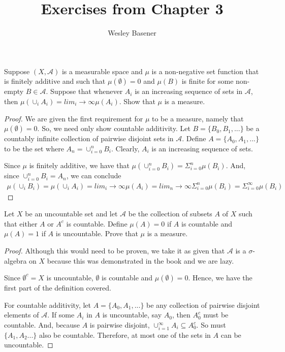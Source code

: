 \documentclass[10pt]{article}
\newenvironment{problem}[2][Problem]{\begin{trivlist}
		\item[\hskip \labelsep {\bfseries #1}\hskip \labelsep {\bfseries #2.}]}{\end{trivlist}}
\begin{document}
	
	\title{Exercises from Chapter 3}
	\author{Wesley Basener}
	\maketitle
	
	\begin{problem}{1}
		Suppose $(X, \mathcal{A})$ is a measurable space and $\mu$ is a
		non-negative set function that is finitely additive and such that
		$\mu(\emptyset) = 0$ and $\mu(B)$ is finite for some non-empty $B \in \mathcal{A}$. Suppose that whenever $A_i$ is an increasing sequence of sets in $\mathcal{A}$, then
		$\mu(\cup_i A_i ) = lim_i \rightarrow \infty \mu(A_i)$. Show that $\mu$ is a measure.
		\begin{proof}
			We are given the first requirement for $\mu$ to be a measure, namely that $\mu(\emptyset) = 0$. So, we need only show countable additivity. Let $B = \{B_0, B_1, ...\}$ be a countably infinite collection of pairwise disjoint sets in $\mathcal{A}$. Define $A = \{A_0, A_1, ...\}$ to be the set where $A_n = \cup_{i=0}^n B_i$. Clearly, $A_i$ is an increasing sequence of sets.
			
			Since $\mu$ is finitely additive, we have that $\mu( \cup_{i=0}^n B_i) = \Sigma_{i=0}^n \mu(B_i)$. And, since $\cup_{i=0}^n B_i = A_n$, we can conclude
			\begin{align*}
				\mu(\cup_i B_i) = \mu(\cup_i A_i) = lim_i \rightarrow \infty \mu(A_i) = lim_n \rightarrow \infty \Sigma_{i=0}^n \mu(B_i) = \Sigma_{i=0}^\infty \mu(B_i)
			\end{align*}
		\end{proof}
		
		\begin{problem}{3}
			Let $X$ be an uncountable set and let $\mathcal{A}$ be the collection of subsets $A$ of $X$ such that either $A$ or $A^c$ is countable. Define
			$\mu(A) = 0$ if $A$ is countable and $\mu(A) = 1$ if $A$ is uncountable. Prove
			that $\mu$ is a measure.
			\begin{proof}
				Although this would need to be proven, we take it as given that $\mathcal{A}$ is a $\sigma$-algebra on $X$ because this was demonstrated in the book and we are lazy.
				
				Since $\emptyset^c = X$ is uncountable, $\emptyset$ is countable and $\mu(\emptyset) = 0$. Hence, we have the first part of the definition covered. 
				
				For countable additivity, let $A = \{A_0, A_1, ...\}$ be any collection of pairwise disjoint elements of $\mathcal{A}$. If some $A_i$ in $A$ is uncountable, say $A_0$, then $A_0^c$ must be countable. And, because $A$ is pairwise disjoint, $\cup_{i=1}^\infty A_i \subseteq A_0^c$. So must $\{A_1, A_2 ...\}$ also be countable. Therefore, at most one of the sets in $A$ can be uncountable.
				

\end{proof}
\end{problem}
\end{problem}
\end{document}
